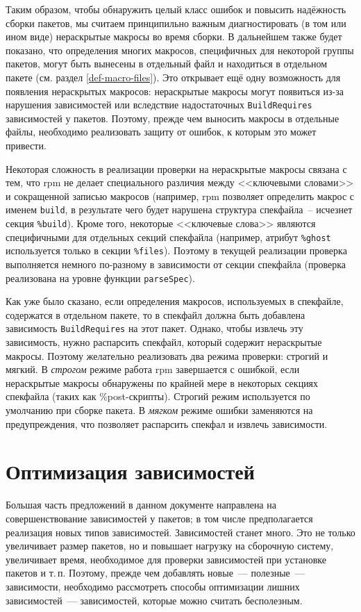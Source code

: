 \documentclass[russian,a4paper,12pt,titlepage]{article}
\begin{document}
Таким образом, чтобы обнаружить целый класс ошибок и повысить надёжность сборки пакетов, мы считаем принципильно
важным диагностировать (в том или ином виде) нераскрытые макросы во время сборки.  В дальнейшем также будет показано, что
определения многих макросов, специфичных для некоторой группы пакетов, могут быть вынесены в отдельный файл и находиться
в отдельном пакете (см. раздел \ref{def-macro-files}).  Это открывает ещё одну возможность для появления нераскрытых
макросов: нераскрытые макросы могут появиться из-за нарушения зависимостей или вследствие надостаточных \verb|BuildRequires|
зависимостей у пакетов.  Поэтому, прежде чем выносить макросы в отдельные файлы, необходимо реализовать защиту от ошибок,
к которым это может привести.

Некоторая сложность в реализации проверки на нераскрытые макросы связана с тем, что rpm не делает специального различия
между <<ключевыми словами>> и сокращенной записью макросов (например, rpm позволяет определить макрос с именем \verb|build|,
в результате чего будет нарушена структура спекфайла~-- исчезнет секция \verb|%build|).  Кроме того, некоторые <<ключевые слова>>
являются специфичными для отдельных секций спекфайла (например, атрибут \verb|%ghost| используется только в секции \verb|%files|).
Поэтому в текущей реализации проверка выполняется немного по-разному в зависимости от секции спекфайла (проверка реализована
на уровне функции \verb|parseSpec|).

Как уже было сказано, если определения макросов, используемых в спекфайле, содержатся в отдельном пакете,
то в спекфайл должна быть добавлена зависимость \verb|BuildRequires| на этот пакет.  Однако, чтобы извлечь эту зависимость,
нужно распарсить спекфайл, который содержит нераскрытые макросы.  Поэтому желательно реализовать два режима
проверки: строгий и мягкий.  В \textit{строгом} режиме работа rpm завершается с ошибкой, если нераскрытые макросы обнаружены
по крайней мере в некоторых секциях спекфайла (таких как \%post-скрипты).  Строгий режим используется по умолчанию при сборке пакета.
В \textit{мягком} режиме ошибки заменяются на предупреждения, что позволяет распарсить спекфал и извлечь зависимости.

\section{Оптимизация зависимостей}
Большая часть предложений в данном документе направлена на совершенствование зависимостей у пакетов;
в том числе предполагается реализация новых типов зависимостей.  Зависимостей станет много.  Это не только
увеличивает размер пакетов, но и повышает нагрузку на сборочную систему, увеличивает время, необходимое
для проверки зависимостей при установке пакетов и т.\,п.  Поэтому, прежде чем добавлять новые~--- полезные~---
зависимости, необходимо рассмотреть способы оптимизации лишних зависимостей~--- зависимостей, которые можно
считать бесполезным.
\end{document}
